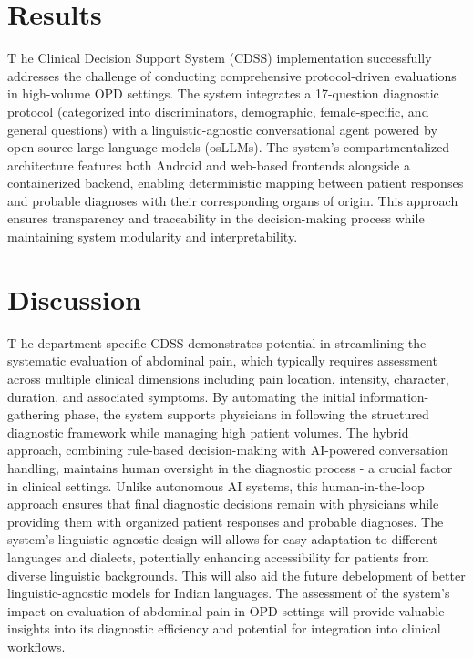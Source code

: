\section{Results}
\lettrine{T}{ }he Clinical Decision Support System (CDSS) implementation successfully addresses the challenge of conducting comprehensive protocol-driven evaluations in high-volume OPD settings. The system integrates a 17-question diagnostic protocol (categorized into discriminators, demographic, female-specific, and general questions) with a linguistic-agnostic conversational agent powered by open source large language models (osLLMs). The system's compartmentalized architecture features both Android and web-based frontends alongside a containerized backend, enabling deterministic mapping between patient responses and probable diagnoses with their corresponding organs of origin. This approach ensures transparency and traceability in the decision-making process while maintaining system modularity and interpretability.


\section{Discussion}
\lettrine{T}{ }he department-specific CDSS demonstrates potential in streamlining the systematic evaluation of abdominal pain, which typically requires assessment across multiple clinical dimensions including pain location, intensity, character, duration, and associated symptoms. By automating the initial information-gathering phase, the system supports physicians in following the structured diagnostic framework while managing high patient volumes. The hybrid approach, combining rule-based decision-making with AI-powered conversation handling, maintains human oversight in the diagnostic process - a crucial factor in clinical settings. Unlike autonomous AI systems, this human-in-the-loop approach ensures that final diagnostic decisions remain with physicians while providing them with organized patient responses and probable diagnoses. The system's linguistic-agnostic design will allows for easy adaptation to different languages and dialects, potentially enhancing accessibility for patients from diverse linguistic backgrounds. This will also aid the future debelopment of better linguistic-agnostic models for Indian languages. The assessment of the system's impact on evaluation of abdominal pain in OPD settings will provide valuable insights into its diagnostic efficiency and potential for integration into clinical workflows.